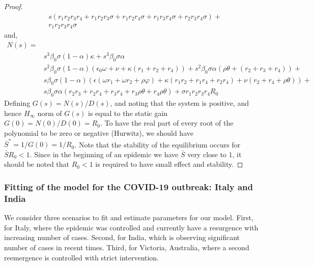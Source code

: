 \documentclass[fleqn,10pt]{wlscirep}
\begin{document}
\begin{proof}
\begin{equation}
\begin{split}
& s \left(r_{1} r_{2} r_{3} r_{4} + r_{1} r_{2} r_{3} \sigma + r_{1} r_{2} r_{4} \sigma + r_{1} r_{3} r_{4} \sigma + r_{2} r_{3} r_{4} \sigma\right) +\\ 
& r_{1} r_{2} r_{3} r_{4} \sigma 
\end{split}
\end{equation}
%
and,
\begin{equation}
\begin{split}
N(s) = \\
& s^{3} \beta_0 \sigma \left( 1-  \alpha\right) \kappa + s^{3} \beta_0 \sigma \alpha \\
& s^{2} \beta_0 \sigma \left( 1-\alpha\right)\left( \epsilon_0 \omega + \nu + \kappa \left( r_1+r_2+r_4\right) \right) + s^{2} \beta_0 \sigma \alpha \left( \rho \theta + \left( r_2+r_3+r_4\right) \right) + \\
& s \beta_0 \sigma (1-\alpha) (\epsilon ( \omega r_1+  \omega r_2 + \rho \varphi ) + \kappa (r_1r_2+r_1r_4+r_2r_4) + \nu (r_2+r_4+\rho \theta)) + \\
& s \beta_0 \sigma \alpha (r_2r_3+r_2r_4+r_3r_4+r_3 \rho \theta + r_4 \rho \theta) + \sigma r_1 r_2 r_3 r_4 R_0
\end{split}
\end{equation}
%
%
Defining $G(s) = N(s)/D(s)$, and noting that the system is positive, and hence $H_{\infty}$ norm of $G(s)$ is equal to the static gain $G(0) = N(0)/D(0) = R_0$. To have the real part of every root of the polynomial to be zero or negative (Hurwitz), we should have $\bar{S}^* = {1}/{G(0)} = {1}/{R_0}$. Note that the stability of the equilibrium occurs for $\bar{S}R_0 < 1$. Since in the beginning of an epidemic we have $\bar{S}$ very close to $1$, it should be noted that $R_0 < 1$ is required to have  small effect and stability.
\end{proof}
%
%
\subsubsection*{Fitting of the model for the COVID-19 outbreak: Italy and India}
We consider three scenarios to fit and estimate parameters for our model. First, for Italy, where the epidemic was controlled and currently have a resurgence with increasing number of cases. Second, for India, which is observing significant number of cases in recent times. Third, for Victoria, Australia, where a second reemergence is controlled with strict intervention.
\end{document}
